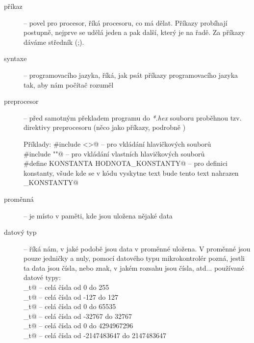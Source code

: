 \begin{description}

\item[příkaz]  -- povel pro procesor, říká procesoru, co má dělat.
Příkazy probíhají postupně, nejprve se udělá jeden a pak další, který je na řadě.
Za příkazy dáváme středník (;).

\item[syntaxe] --  programovacího jazyka, říká, jak psát příkazy programovacího jazyka tak, aby nám počítač rozuměl 

\item[preprocesor] -- před samotným překladem programu do \textit{*.hex} souboru proběhnou tzv. direktivy preprocesoru (něco jako příkazy, podrobně )


Příklady: \verb@#include <>@ -- pro vkládání hlavičkových souborů \\
 \verb@#include ""@ -- pro vkládání vlastních hlavičkových souborů \\
 \verb@#define KONSTANTA HODNOTA_KONSTANTY@ -- pro definici konstanty, všude kde se v kódu vyskytne text \verb@KONSTANTA@ bude tento text nahrazen\\  \verb@HODNOTA_KONSTANTY@

\item[proměnná]   -- je místo v paměti, kde jsou uložena nějaké data

\item[datový typ]\label{data1}  -- říká nám, v jaké podobě jsou data v proměnné uložena. V proměnné jsou pouze jedničky a nuly, pomocí datového typu mikrokontrolér pozná, jestli ta data jsou čísla, nebo znak, v jakém rozsahu jsou čísla, atd...
používané datové typy:   \\
_t@ -- celá čísla od 0 do 255  \\  
_t@ -- celá čísla od -127 do 127 \\
_t@ --  celá čísla od 0 do 65535  \\
_t@ -- celá čísla od -32767 do 32767 \\
_t@ -- celá čísla od 0 do 4294967296 \\
_t@ -- celá čísla od -2147483647 do 2147483647 \\


\end{description}
